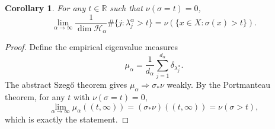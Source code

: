 \documentclass{amsart}
\newtheorem{cor}[thm]{Corollary}
\theoremstyle{definition}
\theoremstyle{remark}
\numberwithin{equation}{section}
\begin{document}
\begin{cor}
For any $t\in\mathbb R$ such that
\(\nu(\sigma=t)=0\),
\[
\lim_{\alpha\to\infty} \frac{1}{\dim \mathcal{H}_\alpha} 
\#\{j:\lambda_j^\alpha>t\}
=
\nu(\{x\in X:\sigma(x)>t\}).
\]
\end{cor}

\begin{proof}
Define the empirical eigenvalue measures
\[
\mu_\alpha = \frac{1}{d_\alpha} \sum_{j=1}^{d_\alpha} \delta_{\lambda_j^\alpha}.
\]
The abstract Szegő theorem gives
\(\mu_\alpha \Rightarrow \sigma_* \nu\) weakly.
By the Portmanteau theorem, for any $t$ with $\nu(\sigma=t)=0$,
\[
\lim_{\alpha\to\infty} \mu_\alpha((t,\infty)) = (\sigma_* \nu)((t,\infty)) = \nu(\sigma>t),
\]
which is exactly the statement.
\end{proof}

\end{document}
